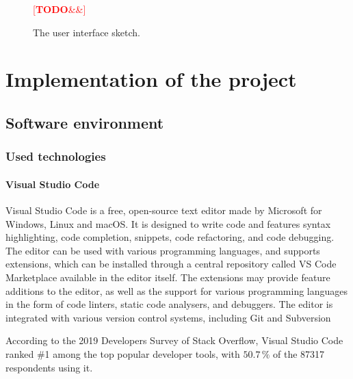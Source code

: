 \documentclass[english,engineering]{wizthesis}
\newcommand{\todo}[1]{%
  \textcolor{red}{[\textbf{TODO}\ifx&#1&{}\else{ }\fi\emph{#1}]}%
}
\begin{document}
\begin{figure}[H]
  \centering
  \todo{}
  \caption{The user interface sketch.}
  \label{fig:interface-prototype}
\end{figure}

\chapter{Implementation of the project}

\section{Software environment}

\subsection{Used technologies} \label{sbs:used-technologies}

\subsubsection*{Visual Studio Code}

Visual Studio Code \cite{vs-code} is a free, open-source text editor made by
Microsoft for Windows, Linux and macOS. It is designed to write code and
features syntax highlighting, code completion, snippets, code refactoring, and
code debugging. The editor can be used with various programming languages, and
supports extensions, which can be installed through a central repository called
VS Code Marketplace available in the editor itself. The extensions may provide
feature additions to the editor, as well as the support for various programming
languages in the form of code linters, static code analysers, and debuggers. The
editor is integrated with various version control systems, including Git and
Subversion

According to the 2019 Developers Survey of Stack Overflow, Visual Studio Code
ranked \#1 among the top popular developer tools, with $50.7\,\%$ of the 87317
respondents using it. \cite{stack-overflow-insights-2019}
\end{document}
